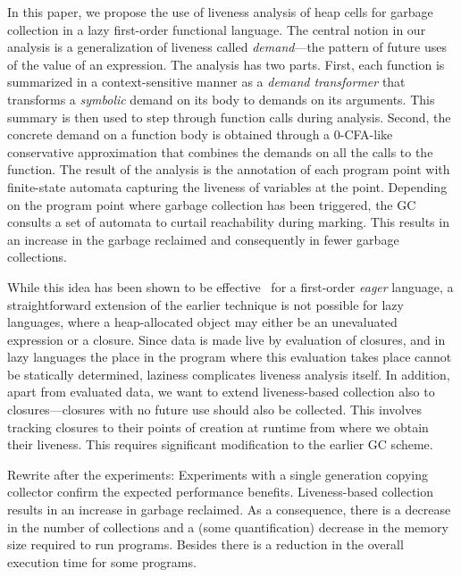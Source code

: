 \documentclass[9pt]{sigplanconf}
\begin{document}
In this paper,  we propose the use of liveness  analysis of heap cells
for garbage collection in a lazy first-order functional language.  The
central notion in our analysis  is a generalization of liveness called
{\em  demand}---the  pattern  of  future  uses  of  the  value  of  an
expression.   The analysis  has two  parts.  First,  each  function is
summarized in a context-sensitive manner as a {\em demand transformer}
that transforms a {\em symbolic} demand  on its body to demands on its
arguments.  This summary  is then used to step  through function calls
during analysis.   Second, the concrete  demand on a function  body is
obtained through a 0-CFA-like conservative approximation that combines
the  demands on  all the  calls to  the function.   The result  of the
analysis  is the annotation  of each  program point  with finite-state
automata capturing  the liveness of variables at  the point. Depending
on the program point where  garbage collection has been triggered, the
GC consults  a set of automata  to curtail reachability
during marking.  This results in  an increase in the garbage reclaimed
and consequently in fewer garbage collections.

While this idea has been shown to be effective~\cite{asati14lgc} for a
first-order {\em  eager} language, a straightforward  extension of the
earlier  technique  is  not  possible  for  lazy  languages,  where  a
heap-allocated  object may either  be an  unevaluated expression  or a
closure. Since  data is  made live by  evaluation of closures,  and in
lazy languages  the place in  the program where this  evaluation takes
place cannot  be statically determined,  laziness complicates liveness
analysis itself.  In  addition, apart from evaluated data,  we want to
extend  liveness-based collection also  to closures---closures with no
future use should also  be collected.  This involves tracking closures
to  their points of  creation at  runtime from  where we  obtain their
liveness.  This  requires significant  modification to the  earlier GC
scheme.

{\color  {Myblue}Rewrite after the experiments:  Experiments  with a
single
  generation  copying  collector   confirm  the  expected  performance
  benefits.   Liveness-based  collection  results  in an  increase  in
  garbage reclaimed.   As a  consequence, there is  a decrease  in the
  number of  collections and a  (some quantification) decrease  in the
  memory size required  to run programs. Besides there  is a reduction
  in the overall execution time for some programs.}
\end{document}

